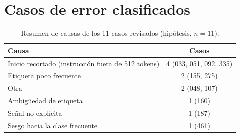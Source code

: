 \documentclass[conference]{IEEEtran}
\begin{document}
\clearpage
\appendices
\section{Casos de error clasificados}
\begin{table}[h]
\centering
\caption{Resumen de causas de los 11 casos revisados (hipótesis, $n=11$).}
\label{tab:causas}
\footnotesize
\begin{tabular}{@{}lc@{}}
\toprule
Causa & Casos \\
\midrule
Inicio recortado (instrucción fuera de 512 tokens) & 4 (033, 051, 092, 335) \\
Etiqueta poco frecuente & 2 (155, 275) \\
Otra & 2 (048, 107) \\
Ambigüedad de etiqueta & 1 (160) \\
Señal no explícita & 1 (187) \\
Sesgo hacia la clase frecuente & 1 (461) \\
\bottomrule
\end{tabular}
\end{table}
\end{document}
